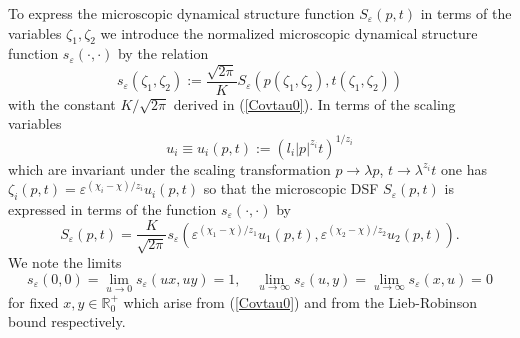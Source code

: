 \documentclass[12pt]{article}
\newcommand{\R}{{\mathbb R}}
\begin{document}
To express the microscopic dynamical structure function $S_{\varepsilon}(p,t)$
in terms of the variables $\zeta_1,\zeta_2$ 
we introduce the normalized 
microscopic dynamical structure function
$s_{\varepsilon}(\cdot,\cdot)$ by the relation
\begin{equation}
s_{\varepsilon}(\zeta_1, \zeta_2) := \frac{\sqrt{2\pi}}{K} S_{\varepsilon}(p(\zeta_1, \zeta_2),t(\zeta_1, \zeta_2))
\label{hsdef}
\end{equation}
with the constant $K/\sqrt{2\pi}$ derived in (\ref{Covtau0}).
In terms of the
scaling variables
\begin{equation}
u_i \equiv u_i(p,t) := (l_i |p|^{z_i} t)^{1/z_i} 
\label{scalvarFT}
\end{equation}
which are invariant under the scaling transformation $p\to \lambda p$,
$t\to \lambda^{z_i} t$ one has
$\zeta_i(p, t) = 
  \varepsilon^{(\chi_i-\chi)/z_i} u_i(p,t) $ so that
the microscopic DSF $S_{\varepsilon}(p,t)$ is expressed
in terms of the function $s_{\varepsilon}(\cdot,\cdot)$ by
\begin{equation}
S_{\varepsilon}(p,t) =
\frac{K}{\sqrt{2\pi}} s_{\varepsilon}
(\varepsilon^{(\chi_1-\chi)/z_1} u_1(p,t),
\varepsilon^{(\chi_2-\chi)/z_2} u_2(p,t)) .
\label{DSFepspt}
\end{equation}
We note the limits
\begin{equation}
s_{\varepsilon}(0,0) = \lim_{u\to 0} s_{\varepsilon}(ux,uy) = 1, \quad
\lim_{u\to\infty} s_{\varepsilon}(u,y) = 
\lim_{u\to\infty} s_{\varepsilon}(x, u) = 0 
\end{equation}
for fixed $x,y \in \R^+_0$ which arise from (\ref{Covtau0}) and
from the Lieb-Robinson bound respectively. 
\end{document}

